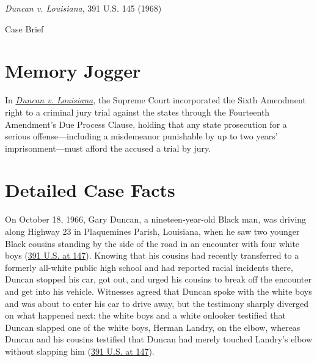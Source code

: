 \documentclass[12pt]{article}
\begin{document}
\begin{center}
{\LARGE \textit{Duncan v. Louisiana}, 391 U.S. 145 (1968)\par}
\vspace{0.8em}
{\large Case Brief\par}
\end{center}
\vspace{1em}

\section{Memory Jogger}

In \href{https://www.courtlistener.com/opinion/107685/duncan-v-louisiana/}{\textit{Duncan v. Louisiana}}, the Supreme Court incorporated the Sixth Amendment right to a criminal jury trial against the states through the Fourteenth Amendment's Due Process Clause, holding that any state prosecution for a serious offense---including a misdemeanor punishable by up to two years' imprisonment---must afford the accused a trial by jury.

\section{Detailed Case Facts}

On October 18, 1966, Gary Duncan, a nineteen-year-old Black man, was driving along Highway 23 in Plaquemines Parish, Louisiana, when he saw two younger Black cousins standing by the side of the road in an encounter with four white boys (\href{https://supreme.justia.com/cases/federal/us/391/145/}{391 U.S. at 147}). Knowing that his cousins had recently transferred to a formerly all-white public high school and had reported racial incidents there, Duncan stopped his car, got out, and urged his cousins to break off the encounter and get into his vehicle. Witnesses agreed that Duncan spoke with the white boys and was about to enter his car to drive away, but the testimony sharply diverged on what happened next: the white boys and a white onlooker testified that Duncan slapped one of the white boys, Herman Landry, on the elbow, whereas Duncan and his cousins testified that Duncan had merely touched Landry's elbow without slapping him (\href{https://caselaw.findlaw.com/court/us-supreme-court/391/145.html}{391 U.S. at 147}).
\end{document}
